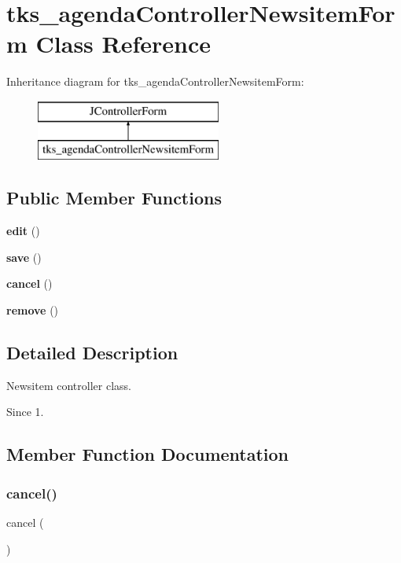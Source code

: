 \section{tks\+\_\+agenda\+Controller\+Newsitem\+Form Class Reference}
\label{classtks__agenda_controller_newsitem_form}
Inheritance diagram for tks\+\_\+agenda\+Controller\+Newsitem\+Form\+:\begin{figure}[H]
\begin{center}
\leavevmode
\includegraphics[height=2.000000cm]{classtks__agenda_controller_newsitem_form}
\end{center}
\end{figure}
\subsection*{Public Member Functions}
\begin{DoxyCompactItemize}
\item 
\textbf{ edit} ()
\item 
\textbf{ save} ()
\item 
\textbf{ cancel} ()
\item 
\textbf{ remove} ()
\end{DoxyCompactItemize}


\subsection{Detailed Description}
Newsitem controller class.

\begin{DoxySince}{Since}
1. 
\end{DoxySince}


\subsection{Member Function Documentation}
\mbox{\label{classtks__agenda_controller_newsitem_form_a649b2b3005c687ae78c9d1d65e973493}} 
\subsubsection{cancel()}
{\footnotesize\ttfamily cancel (\begin{DoxyParamCaption}{ }\end{DoxyParamCaption})}

